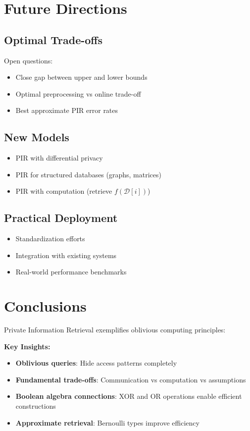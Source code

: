 \documentclass[11pt,final,hidelinks]{article}
\newcommand{\DB}{\mathcal{D}}
\begin{document}
\section{Future Directions}

\subsection{Optimal Trade-offs}

Open questions:
\begin{itemize}
    \item Close gap between upper and lower bounds
    \item Optimal preprocessing vs online trade-off
    \item Best approximate PIR error rates
\end{itemize}

\subsection{New Models}

\begin{itemize}
    \item PIR with differential privacy
    \item PIR for structured databases (graphs, matrices)
    \item PIR with computation (retrieve $f(\DB[i])$)
\end{itemize}

\subsection{Practical Deployment}

\begin{itemize}
    \item Standardization efforts
    \item Integration with existing systems
    \item Real-world performance benchmarks
\end{itemize}

\section{Conclusions}

Private Information Retrieval exemplifies oblivious computing principles:

\textbf{Key Insights:}
\begin{itemize}
    \item \textbf{Oblivious queries}: Hide access patterns completely
    \item \textbf{Fundamental trade-offs}: Communication vs computation vs assumptions
    \item \textbf{Boolean algebra connections}: XOR and OR operations enable efficient constructions
    \item \textbf{Approximate retrieval}: Bernoulli types improve efficiency
\end{itemize}
\end{document}
